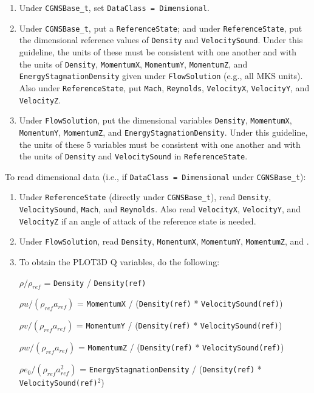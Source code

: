\documentclass[12pt]{article}
\begin{document}
\begin{enumerate}
\item Under {\tt CGNSBase\_t}, set {\tt DataClass = Dimensional}.

\item Under {\tt CGNSBase\_t}, put a {\tt ReferenceState}; and under
{\tt ReferenceState}, put the dimensional reference
values of {\tt Density} and {\tt VelocitySound}.
Under this guideline, the units of these
must be consistent with one another and with the units
of {\tt Density}, {\tt MomentumX}, {\tt MomentumY},
{\tt MomentumZ}, and {\tt EnergyStagnationDensity} given
under {\tt FlowSolution} (e.g., all MKS units).
Also under {\tt ReferenceState},
put {\tt Mach}, {\tt Reynolds},
{\tt VelocityX}, {\tt VelocityY}, and {\tt VelocityZ}.  

\item Under {\tt FlowSolution}, put the dimensional variables
{\tt Density}, {\tt MomentumX}, {\tt MomentumY},
{\tt MomentumZ}, and {\tt EnergyStagnationDensity}.
Under this guideline, the units of these 5 variables
must be consistent with one another and with the
units of {\tt Density} and {\tt VelocitySound} in 
{\tt ReferenceState}.

\end{enumerate}

\noindent To read dimensional data (i.e., if {\tt DataClass = Dimensional}
under {\tt CGNSBase\_t}):

\begin{enumerate}

\item Under {\tt ReferenceState} (directly under {\tt CGNSBase\_t}),
read {\tt Density}, {\tt VelocitySound},
{\tt Mach}, and {\tt Reynolds}.
Also read {\tt VelocityX}, {\tt VelocityY}, and {\tt VelocityZ}
if an angle of attack of the reference state is needed.

\item Under {\tt FlowSolution}, read
{\tt Density}, {\tt MomentumX}, {\tt MomentumY},
{\tt MomentumZ}, and 
.

\item To obtain the PLOT3D Q variables, do the following:

$\rho/\rho_{ref}$ = {\tt Density} / {\tt Density(ref)}

$\rho u/(\rho_{ref}a_{ref})$ = {\tt MomentumX} / ({\tt Density(ref)} * {\tt VelocitySound(ref)})

$\rho v/(\rho_{ref}a_{ref})$ = {\tt MomentumY} / ({\tt Density(ref)} * {\tt VelocitySound(ref)})

$\rho w/(\rho_{ref}a_{ref})$ = {\tt MomentumZ} / ({\tt Density(ref)} * {\tt VelocitySound(ref)})

$\rho e_0/(\rho_{ref}a_{ref}^2)$ = {\tt EnergyStagnationDensity} /
({\tt Density(ref)} * {\tt VelocitySound(ref)}$^2$)

\end{enumerate}
\end{document}
